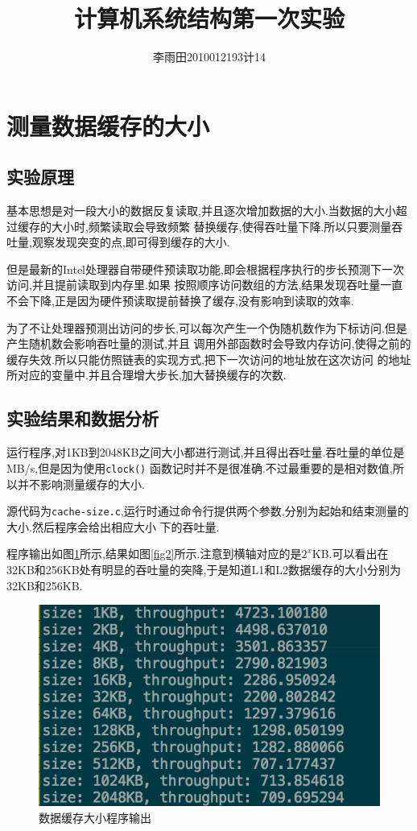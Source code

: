 \documentclass[adobefonts, nocap]{ctexart}
\begin{document}
  \title{计算机系统结构第一次实验}
  \author{李雨田\hspace{1em}2010012193\hspace{1em}计14}
  \maketitle
  \tableofcontents
  \section{测量数据缓存的大小}
    \subsection{实验原理}
      基本思想是对一段大小的数据反复读取,并且逐次增加数据的大小.当数据的大小超过缓存的大小时,频繁读取会导致频繁
      替换缓存,使得吞吐量下降.所以只要测量吞吐量,观察发现突变的点,即可得到缓存的大小.

      但是最新的Intel处理器自带硬件预读取功能,即会根据程序执行的步长预测下一次访问,并且提前读取到内存里.如果
      按照顺序访问数组的方法,结果发现吞吐量一直不会下降,正是因为硬件预读取提前替换了缓存,没有影响到读取的效率.

      为了不让处理器预测出访问的步长,可以每次产生一个伪随机数作为下标访问.但是产生随机数会影响吞吐量的测试,并且
      调用外部函数时会导致内存访问,使得之前的缓存失效.所以只能仿照链表的实现方式,把下一次访问的地址放在这次访问
      的地址所对应的变量中.并且合理增大步长,加大替换缓存的次数.
    \subsection{实验结果和数据分析}
      运行程序,对1KB到2048KB之间大小都进行测试,并且得出吞吐量.吞吐量的单位是MB/s,但是因为使用\texttt{clock()}
      函数记时并不是很准确.不过最重要的是相对数值,所以并不影响测量缓存的大小.

      源代码为\texttt{cache-size.c},运行时通过命令行提供两个参数,分别为起始和结束测量的大小.然后程序会给出相应大小
      下的吞吐量.

      程序输出如图\ref{fig1}所示,结果如图\ref{fig2}所示.注意到横轴对应的是$2^{x}$KB.可以看出在32KB和256KB处有明显的吞吐量的突降,于是知道L1和L2数据缓存的大小分别为
      32KB和256KB.

      \begin{figure}[htbp]
        \includegraphics[width=12cm]{1.png}
        \caption{数据缓存大小程序输出}
        \label{fig1}
      \end{figure}
\end{document}
